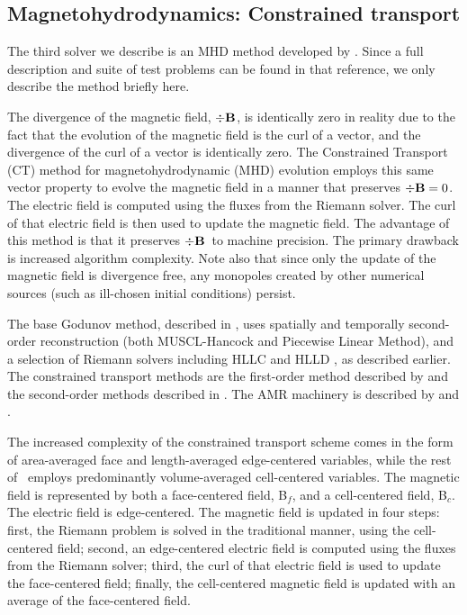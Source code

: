 \subsection{Magnetohydrodynamics: Constrained transport}
\label{sec.num.mhd-ct}
\def\Bvec{{\bf B}}
\def\Bf{Bf}
\def\Bc{Bc}
\def\Evec{{\bf E}}
\def\Divb{\ensuremath{\div \Bvec}}

The third solver we describe is an MHD method developed by
\citet{Collins10}.  Since a full description and suite of test
problems can be found in that reference, we only describe the method
briefly here.

The divergence of the magnetic field, \Divb, is identically zero in
reality due to the fact that the evolution of the magnetic field is
the curl of a vector, and the divergence of the curl of a vector is
identically zero.  The Constrained Transport (CT) method
\citep{Evans88, Balsara99} for magnetohydrodynamic (MHD) evolution
employs this same vector property to evolve the magnetic field in a
manner that preserves $\Divb=0$.  The electric field is computed using
the fluxes from the Riemann solver.  The curl of that electric field
is then used to update the magnetic field.  The advantage of this
method is that it preserves \Divb\ to machine precision.  The primary
drawback is increased algorithm complexity.  Note also that since only
the update of the magnetic field is divergence free, any monopoles
created by other numerical sources (such as ill-chosen initial
conditions) persist.

The base Godunov method, described in \citet{Li08a}, uses spatially
and temporally second-order reconstruction (both MUSCL-Hancock and
Piecewise Linear Method), and a selection of Riemann solvers including
HLLC and HLLD \citep{Mignone07}, as described earlier.  The
constrained transport methods are the first-order method described by
\citet{Balsara99} and the second-order methods described in
\citet{Gardiner05}.  The AMR machinery is described by
\citet{Balsara01} and \citet{Collins10}.

The increased complexity of the constrained transport scheme comes in
the form of area-averaged face and length-averaged edge-centered
variables, while the rest of \enzo\ employs predominantly
volume-averaged cell-centered variables.  The magnetic field is
represented by both a face-centered field, B$_f$, and a cell-centered
field, B$_c$.  The electric field is edge-centered.  The magnetic
field is updated in four steps: first, the Riemann problem is solved
in the traditional manner, using the cell-centered field; second, an
edge-centered electric field is computed using the fluxes from the
Riemann solver; third, the curl of that electric field is used to
update the face-centered field; finally, the cell-centered magnetic
field is updated with an average of the face-centered field.

